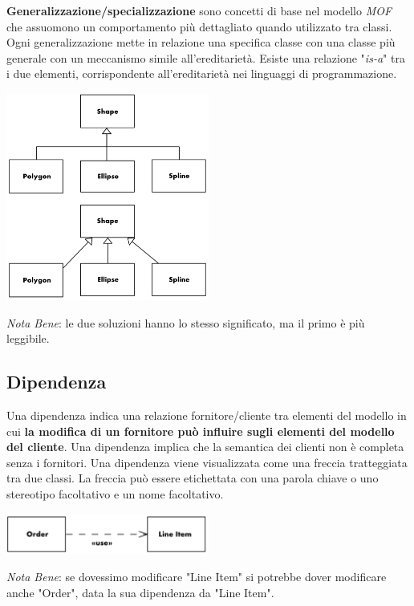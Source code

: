 \documentclass{article}
\begin{document}
\textbf{Generalizzazione/specializzazione} sono concetti di base nel modello \textit{MOF} che assuomono un comportamento più dettagliato quando utilizzato tra classi. Ogni generalizzazione mette in relazione una specifica classe con una classe più generale con un meccanismo simile all'ereditarietà. Esiste una relazione "\textit{is-a}" tra i due elementi, corrispondente all'ereditarietà nei linguaggi di programmazione.
\begin{center}
    \includegraphics[width=0.5\textwidth]{foto 4.png}
\end{center}
\textit{Nota Bene}: le due soluzioni hanno lo stesso significato, ma il primo è più leggibile.

\subsection*{Dipendenza}
\large

Una dipendenza indica una relazione fornitore/cliente tra elementi del modello in cui \textbf{la modifica di un fornitore può influire sugli elementi del modello del cliente}. Una dipendenza implica che la semantica dei clienti non è completa senza i fornitori.
Una dipendenza viene visualizzata come una freccia tratteggiata tra due classi. La freccia può essere etichettata con una parola chiave o uno stereotipo facoltativo e un nome facoltativo.
\begin{center}
    \includegraphics[width=0.5\textwidth]{foto 5.png}
\end{center}
\textit{Nota Bene}: se dovessimo modificare "Line Item" si potrebbe dover modificare anche "Order", data la sua dipendenza da "Line Item".
\end{document}
